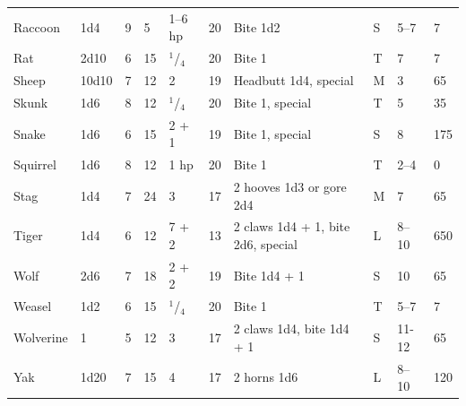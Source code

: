 \begin{minipage}{\columnwidth}
\begin{tabular}{p{}p{}p{}p{}p{}p{}p{}p{}p{}p{}}
\rowcolor[gray]{.9}Raccoon	& 1d4	& 9	& 5	& 1--6 hp	& 20	& Bite 1d2	& S	& 5--7	& 7 \\
Rat		& 2d10	& 6	& 15	& $^1$/$_4$	& 20	& Bite 1	& T	& 7	& 7 \\
\rowcolor[gray]{.9}Sheep	& 10d10	& 7	& 12	& 2	& 19	& Headbutt 1d4, special	& M	& 3	& 65 \\
Skunk	& 1d6	& 8	& 12	& $^1$/$_4$	& 20	& Bite 1, special	& T	& 5	& 35 \\
\rowcolor[gray]{.9}Snake	& 1d6	& 6	& 15	& 2 + 1	& 19	& Bite 1, special	& S	& 8	& 175 \\ 
Squirrel	& 1d6	& 8	& 12	& 1 hp	& 20	& Bite 1	& T	& 2--4	& 0 \\
\rowcolor[gray]{.9}Stag	& 1d4	& 7	& 24	& 3		& 17	& 2 hooves 1d3 or gore 2d4	& M	& 7	& 65 \\
Tiger	& 1d4	& 6	& 12	& 7 + 2	& 13	& 2 claws 1d4 + 1, bite 2d6, special	& L	& 8--10	& 650 \\ %
\rowcolor[gray]{.9}Wolf	& 2d6	& 7	& 18	& 2 + 2	& 19	& Bite 1d4 + 1	& S	& 10	& 65 \\ %
Weasel	& 1d2	& 6	& 15	& $^1$/$_4$	& 20	& Bite 1	& T	& 5--7	& 7 \\
\rowcolor[gray]{.9}Wolverine	& 1	& 5	& 12	& 3		& 17	& 2 claws 1d4, bite 1d4 + 1	& S	& 11-12	& 65 \\ %
Yak	& 1d20	& 7	& 15	& 4	& 17	& 2 horns 1d6	& L	& 8--10	& 120	\\ %
		
\end{tabular}

\end{minipage}	

